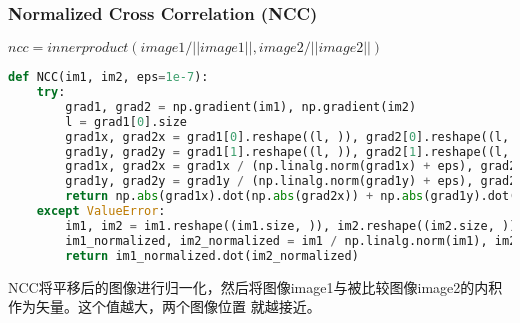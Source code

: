 \documentclass[withoutpreface,bwprint]{cumcmthesis} %
\begin{document}
\subsubsection*{Normalized Cross Correlation (NCC)}
$ncc = innerproduct( image1 / ||image1||, image2 / ||image2|| )$
\begin{lstlisting}[language=python]
def NCC(im1, im2, eps=1e-7):
	try:
		grad1, grad2 = np.gradient(im1), np.gradient(im2)
		l = grad1[0].size
		grad1x, grad2x = grad1[0].reshape((l, )), grad2[0].reshape((l, ))
		grad1y, grad2y = grad1[1].reshape((l, )), grad2[1].reshape((l, ))
		grad1x, grad2x = grad1x / (np.linalg.norm(grad1x) + eps), grad2x / (np.linalg.norm(grad2x) + eps)
		grad1y, grad2y = grad1y / (np.linalg.norm(grad1y) + eps), grad2y / (np.linalg.norm(grad2y) + eps)
        return np.abs(grad1x).dot(np.abs(grad2x)) + np.abs(grad1y).dot(np.abs(grad2y))
    except ValueError:
		im1, im2 = im1.reshape((im1.size, )), im2.reshape((im2.size, ))
		im1_normalized, im2_normalized = im1 / np.linalg.norm(im1), im2 / np.linalg.norm(im2)
		return im1_normalized.dot(im2_normalized)
    \end{lstlisting}

NCC将平移后的图像进行归一化，然后将图像image1与被比较图像image2的内积作为矢量。这个值越大，两个图像位置
就越接近。
\end{document}
